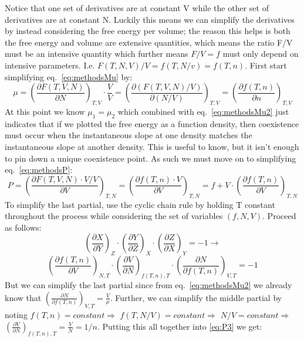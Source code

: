 Notice that one set of derivatives are at constant V while the other set of derivatives are at constant N. Luckily this means we can simplify the derivatives by instead considering the free energy per volume; the reason this helps is both the free energy and volume are extensive quantities, which means the ratio F/V must be an intensive quantity which further means $F/V=f$ must only depend on intensive parameters. I.e. $F(T,N,V)/V=f(T,N/v)=f(T,n)$. First start simplifying eq.~\ref{eq:methodsMu} by:
\begin{equation}\label{eq:methodsMu2}
\mu=\left(\frac{\partial F(T,V,N)}{\partial N}\right)_{T,V}\cdot\frac{V}{V}=\left(\frac{\partial (F(T,V,N)/V)}{\partial (N/V)}\right)_{T,V}=\left(\frac{\partial f(T,n)}{\partial n}\right)_{T,V}
\end{equation}
At this point we know $\mu_1=\mu_2$ which combined with eq.~\ref{eq:methodsMu2} just indicates that if we plotted the free energy as a function density, then coexistence must occur when the instantaneous slope at one density matches the instantaneous slope at another density. This is useful to know, but it isn't enough to pin down a unique coexistence point. As such we must move on to simplifying eq.~\ref{eq:methodsP}:
\begin{equation}\label{eq:methodsP2}
P=\left(\frac{\partial F(T,V,N)\cdot V/V}{\partial V}\right)_{T,N}=\left(\frac{\partial f(T,n)\cdot V}{\partial V}\right)_{T,N}=f+V\cdot\left(\frac{\partial f(T,n)}{\partial V}\right)_{T,N}
\end{equation}
To simplify the last partial, use the cyclic chain rule by holding T constant throughout the process while considering the set of variables $(f,N,V)$. Proceed as follows:
$$\left(\frac{\partial X}{\partial Y}\right)_Z\cdot \left(\frac{\partial Y}{\partial Z}\right)_X\cdot
\left(\frac{\partial Z}{\partial X}\right)_Y=-1 \rightarrow$$
\begin{equation}\label{eq:P3}
\left(\frac{\partial f(T,n)}{\partial V}\right)_{N,T} \cdot\left(\frac{\partial V}{\partial N}\right)_{f(T,n),T} \cdot\left(\frac{\partial N}{\partial f(T,n)}\right)_{V,T}=-1
\end{equation}
\sloppy But we can simplify the last partial since from eq.~\ref{eq:methodsMu2} we already know that $\left(\frac{\partial N}{\partial f(T,n)}\right)_{V,T}=\frac{V}{\mu}$. Further, we can simplify the middle partial by noting $f(T,n)=constant\Rightarrow$ $f(T,N/V)=constant \Rightarrow$ $N/V=constant \Rightarrow$ $\left(\frac{\partial V}{\partial N}\right)_{f(T,n),T}=\frac{V}{N}=1/n$. Putting this all together into \ref{eq:P3} we get:
